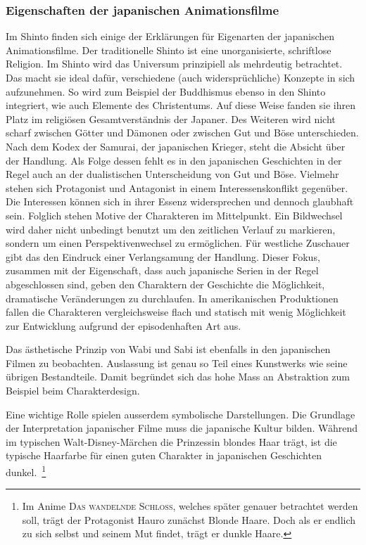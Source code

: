 \subsubsection{Eigenschaften der japanischen Animationsfilme}
Im Shinto finden sich einige der Erklärungen für Eigenarten der japanischen Animationsfilme. Der traditionelle Shinto ist eine unorganisierte, schriftlose Religion. Im Shinto wird das Universum prinzipiell als mehrdeutig betrachtet. Das macht sie ideal dafür, verschiedene (auch widersprüchliche) Konzepte in sich aufzunehmen. So wird zum Beispiel der Buddhismus ebenso in den Shinto integriert, wie auch Elemente des Christentums. Auf diese Weise fanden sie ihren Platz im religiösen Gesamtverständnis der Japaner. Des Weiteren wird nicht scharf zwischen Götter und Dämonen oder zwischen Gut und Böse unterschieden. Nach dem Kodex der Samurai, der japanischen Krieger, steht die Absicht über der Handlung. Als Folge dessen fehlt es in den japanischen Geschichten in der Regel auch an der dualistischen Unterscheidung von Gut und Böse. Vielmehr stehen sich Protagonist und Antagonist in einem Interessenskonflikt gegenüber. Die Interessen können sich in ihrer Essenz widersprechen und dennoch glaubhaft sein. 
Folglich stehen Motive der Charakteren im Mittelpunkt. Ein Bildwechsel wird daher nicht unbedingt benutzt um den zeitlichen Verlauf zu markieren, sondern um einen Perspektivenwechsel zu ermöglichen. Für westliche Zuschauer gibt das den Eindruck einer Verlangsamung der Handlung. Dieser Fokus, zusammen mit der Eigenschaft, dass auch japanische Serien in der Regel abgeschlossen sind, geben den Charaktern der Geschichte die Möglichkeit, dramatische Veränderungen zu durchlaufen. In amerikanischen Produktionen fallen die Charakteren vergleichsweise flach und statisch mit wenig Möglichkeit zur Entwicklung aufgrund der episodenhaften Art aus. 

Das ästhetische Prinzip von Wabi und Sabi ist ebenfalls in den japanischen Filmen zu beobachten. Auslassung ist genau so Teil eines Kunstwerks wie seine übrigen Bestandteile. Damit begründet sich das hohe Mass an Abstraktion zum Beispiel beim Charakterdesign.
 
Eine wichtige Rolle spielen ausserdem symbolische Darstellungen. Die Grundlage der Interpretation japanischer Filme muss die japanische Kultur bilden. Während im typischen Walt-Disney-Märchen die Prinzessin blondes Haar trägt, ist die typische Haarfarbe für einen guten Charakter in japanischen Geschichten dunkel.~\footnote{Im Anime \textsc{Das wandelnde Schloss}, welches später genauer betrachtet werden soll, trägt der Protagonist Hauro zunächst Blonde Haare. Doch als er endlich zu sich selbst und seinem Mut findet, trägt er dunkle Haare.} 

